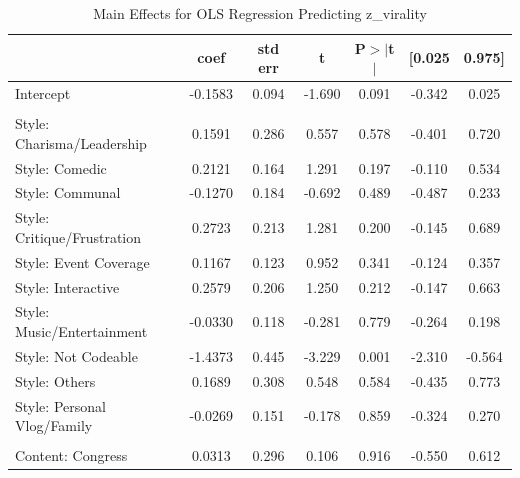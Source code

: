 \documentclass[12pt,a4paper]{report}
\begin{document}
\begin{table}
    \centering
    \captionsetup{justification=centering}
    \caption{Main Effects for OLS Regression Predicting z\_virality}
    \label{tab:ols_virality_main}
    \scriptsize
    \setlength{\tabcolsep}{3pt}

    \begin{tabular}{@{}l S[table-format=-1.4] S[table-format=1.3] S[table-format=-1.3] S[table-format=1.3] S[table-format=-1.3] S[table-format=1.3]@{}}
        \toprule
        & {\textbf{coef}} & {\textbf{std err}} & {\textbf{t}} & {\textbf{P$> |$t$|$}} & {\textbf{[0.025}} & {\textbf{0.975]}} \\
        \midrule
        Intercept                            & -0.1583 & 0.094 & -1.690 & 0.091 & -0.342 & 0.025 \\
        \addlinespace
         \\ \addlinespace
        Style: Charisma/Leadership           & 0.1591  & 0.286 & 0.557  & 0.578 & -0.401 & 0.720 \\
        Style: Comedic                       & 0.2121  & 0.164 & 1.291  & 0.197 & -0.110 & 0.534 \\
        Style: Communal                      & -0.1270 & 0.184 & -0.692 & 0.489 & -0.487 & 0.233 \\
        Style: Critique/Frustration          & 0.2723  & 0.213 & 1.281  & 0.200 & -0.145 & 0.689 \\
        Style: Event Coverage                & 0.1167  & 0.123 & 0.952  & 0.341 & -0.124 & 0.357 \\
        Style: Interactive                   & 0.2579  & 0.206 & 1.250  & 0.212 & -0.147 & 0.663 \\
        Style: Music/Entertainment           & -0.0330 & 0.118 & -0.281 & 0.779 & -0.264 & 0.198 \\
        Style: Not Codeable                  & -1.4373 & 0.445 & -3.229 & 0.001 & -2.310 & -0.564 \\
        Style: Others                        & 0.1689  & 0.308 & 0.548  & 0.584 & -0.435 & 0.773 \\
        Style: Personal Vlog/Family          & -0.0269 & 0.151 & -0.178 & 0.859 & -0.324 & 0.270 \\
        \addlinespace
         \\ \addlinespace
        Content: Congress                    & 0.0313  & 0.296 & 0.106  & 0.916 & -0.550 & 0.612 \\

\end{tabular}
\end{table}
\end{document}
